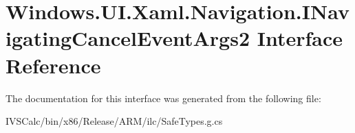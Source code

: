\hypertarget{interface_windows_1_1_u_i_1_1_xaml_1_1_navigation_1_1_i_navigating_cancel_event_args2}{}\section{Windows.\+U\+I.\+Xaml.\+Navigation.\+I\+Navigating\+Cancel\+Event\+Args2 Interface Reference}
\label{interface_windows_1_1_u_i_1_1_xaml_1_1_navigation_1_1_i_navigating_cancel_event_args2}


The documentation for this interface was generated from the following file\+:\begin{DoxyCompactItemize}
\item 
I\+V\+S\+Calc/bin/x86/\+Release/\+A\+R\+M/ilc/Safe\+Types.\+g.\+cs\end{DoxyCompactItemize}
